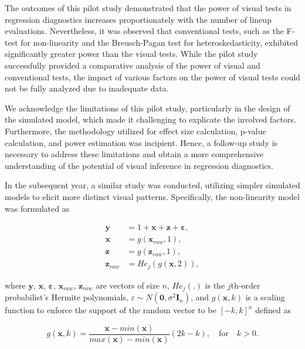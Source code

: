 \documentclass[11pt,a4paper,]{article}
\begin{document}
The outcomes of this pilot study demonstrated that the power of visual tests in regression diagnostics increases proportionately with the number of lineup evaluations. Nevertheless, it was observed that conventional tests, such as the F-test for non-linearity and the Breusch-Pagan test for heteroskedasticity, exhibited significantly greater power than the visual tests. While the pilot study successfully provided a comparative analysis of the power of visual and conventional tests, the impact of various factors on the power of visual tests could not be fully analyzed due to inadequate data.

We acknowledge the limitations of this pilot study, particularly in the design of the simulated model, which made it challenging to explicate the involved factors. Furthermore, the methodology utilized for effect size calculation, p-value calculation, and power estimation was incipient. Hence, a follow-up study is necessary to address these limitations and obtain a more comprehensive understanding of the potential of visual inference in regression diagnostics.

In the subsequent year, a similar study was conducted, utilizing simpler simulated models to elicit more distinct visual patterns. Specifically, the non-linearity model was formulated as

\begin{align} \label{eq:nonlinearity-model}
\boldsymbol{y} &= 1 + \boldsymbol{x} + \boldsymbol{z} + \boldsymbol{\varepsilon},\\
\boldsymbol{x} &= g(\boldsymbol{x}_{raw}, 1), \\
\boldsymbol{z} &= g(\boldsymbol{z}_{raw}, 1), \\
\boldsymbol{z}_{raw} &= He_j(g(\boldsymbol{x}, 2)),
\end{align}

\noindent where \(\boldsymbol{y}\), \(\boldsymbol{x}\), \(\boldsymbol{\varepsilon}\), \(\boldsymbol{x}_{raw}\), \(\boldsymbol{z}_{raw}\) are vectors of size \(n\), \(He_{j}(.)\) is the \(j\)th-order probabilist's Hermite polynomials, \(\varepsilon \sim N(\boldsymbol{0}, \sigma^2\boldsymbol{I}_n)\), and \(g(\boldsymbol{x}, k)\) is a scaling function to enforce the support of the random vector to be \([-k, k]^n\) defined as

\begin{equation} \label{eq:scaling-function}
g(\boldsymbol{x}, k) = \frac{\boldsymbol{x} - min(\boldsymbol{x})}{max(\boldsymbol{x}) - min(\boldsymbol{x})}(2k - k), \quad \text{for} \quad k > 0. 
\end{equation}
\end{document}

